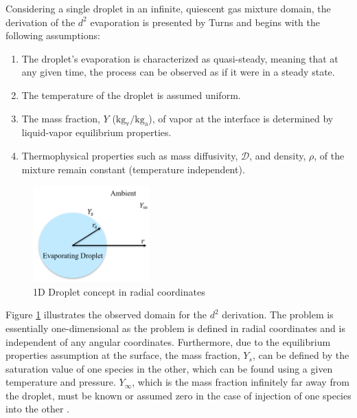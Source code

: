 \documentclass[12pt]{article}
\numberwithin{equation}{section}
\begin{document}
Considering a single droplet in an infinite, quiescent gas mixture domain, the derivation of the $d^{2}$ evaporation is presented by Turns \cite{turns2011introduction} and begins with the following assumptions:
\begin{enumerate}
    \item The droplet's evaporation is characterized as quasi-steady, meaning that at any given time, the process can be observed as if it were in a steady state. 
    \item The temperature of the droplet is assumed uniform.
    \item The mass fraction, $Y$ ($\mathrm{kg_{v}/kg_{a}}$), of vapor at the interface is determined by liquid-vapor equilibrium properties.
    \item Thermophysical properties such as mass diffusivity, $\mathcal{D}$, and density, $\rho$, of the mixture remain constant (temperature independent). 
\end{enumerate}
\begin{figure}[h!]
    \centering
    \includegraphics[width=0.4\textwidth]{Figures/Droplet_evap_concept.png}
    \caption{1D Droplet concept in radial coordinates}
    \label{f:D2 concept}
\end{figure}
Figure \ref{f:D2 concept} illustrates the observed domain for the $d^{2}$ derivation. The problem is essentially one-dimensional as the problem is defined in radial coordinates and is independent of any angular coordinates. Furthermore, due to the equilibrium properties assumption at the surface, the mass fraction, $Y_{s}$, can be defined by the saturation value of one species in the other, which can be found using a given temperature and pressure. $Y_{\infty}$, which is the mass fraction infinitely far away from the droplet, must be known or assumed zero in the case of injection of one species into the other \cite{turns2011introduction}. 
\end{document}
